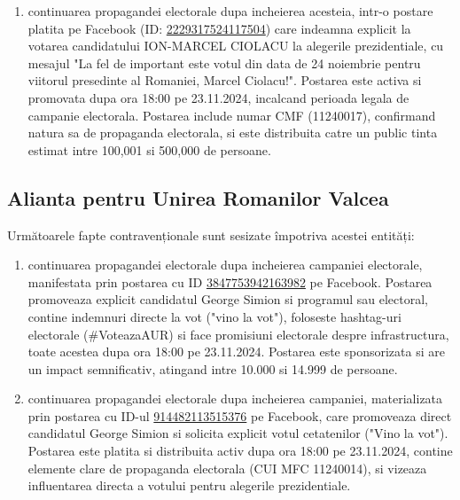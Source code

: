 \documentclass[a4paper,12pt]{article}
\begin{document}
\begin{enumerate}[leftmargin=*, label=\arabic*.)]
    \item continuarea propagandei electorale dupa incheierea acesteia, intr-o postare platita pe Facebook (ID: \href{https://www.facebook.com/ads/library/?id=2229317524117504}{2229317524117504}) care indeamna explicit la votarea candidatului ION-MARCEL CIOLACU la alegerile prezidentiale, cu mesajul "La fel de important este votul din data de 24 noiembrie pentru viitorul presedinte al Romaniei, Marcel Ciolacu!". Postarea este activa si promovata dupa ora 18:00 pe 23.11.2024, incalcand perioada legala de campanie electorala. Postarea include numar CMF (11240017), confirmand natura sa de propaganda electorala, si este distribuita catre un public tinta estimat intre 100,001 si 500,000 de persoane.
\end{enumerate}

\vspace{0.5cm}

\subsection{Alianta pentru Unirea Romanilor Valcea}
Următoarele fapte contravenționale sunt sesizate împotriva acestei entități:

\begin{enumerate}[leftmargin=*, label=\arabic*.)]
    \item continuarea propagandei electorale dupa incheierea campaniei electorale, manifestata prin postarea cu ID \href{https://www.facebook.com/ads/library/?id=3847753942163982}{3847753942163982} pe Facebook. Postarea promoveaza explicit candidatul George Simion si programul sau electoral, contine indemnuri directe la vot ("vino la vot"), foloseste hashtag-uri electorale (\#VoteazaAUR) si face promisiuni electorale despre infrastructura, toate acestea dupa ora 18:00 pe 23.11.2024. Postarea este sponsorizata si are un impact semnificativ, atingand intre 10.000 si 14.999 de persoane.
    \item continuarea propagandei electorale dupa incheierea campaniei, materializata prin postarea cu ID-ul \href{https://www.facebook.com/ads/library/?id=914482113515376}{914482113515376} pe Facebook, care promoveaza direct candidatul George Simion si solicita explicit votul cetatenilor ("Vino la vot"). Postarea este platita si distribuita activ dupa ora 18:00 pe 23.11.2024, contine elemente clare de propaganda electorala (CUI MFC 11240014), si vizeaza influentarea directa a votului pentru alegerile prezidentiale.
\end{enumerate}
\end{document}
